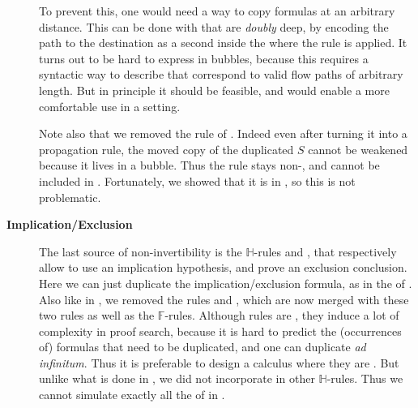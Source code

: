 \begin{description}
    To prevent this, one would need a way to copy formulas at an arbitrary
    distance. This can be done with  that are \emph{doubly} deep,
    by encoding the path to the destination as a second   inside
    the  where the rule is applied. It turns out
    to be hard to express in bubbles, because this requires a syntactic way to
    describe  that correspond to valid flow paths of arbitrary
    length. But in
    principle it should be feasible, and would enable a more comfortable use in
    a  setting.

    Note also that we removed the  rule of .
    Indeed even after turning it into a propagation rule, the moved copy of the
    duplicated  $S$ cannot be weakened because it lives in a 
    bubble. Thus the rule stays non-, and cannot be included in
    . Fortunately, we showed that it is  in
    , so this is not problematic.

  \item[\textbf{Implication/Exclusion}]
    The last source of non-invertibility is the $\mathbb{H}$-rules
    \rsf{{\limp}{-}} and \rsf{{\lsub}{+}}, that respectively allow to use an
    implication hypothesis, and prove an exclusion conclusion.
    Here we can just duplicate the implication/exclusion formula, as in the
     of . Also like in , we removed
    the  rules  and , which are now merged with
    these two rules as well as the $\mathbb{F}$-rules. Although 
    rules are , they induce a lot of complexity in proof search,
    because it is hard to predict the (occurrences of) formulas that need to be
    duplicated, and one can duplicate \emph{ad infinitum}. Thus it is preferable
    to design a calculus where they are . But unlike what is done in
    , we did not incorporate  in other
    $\mathbb{H}$-rules. Thus we cannot simulate exactly all the  of  in .

\end{description}

